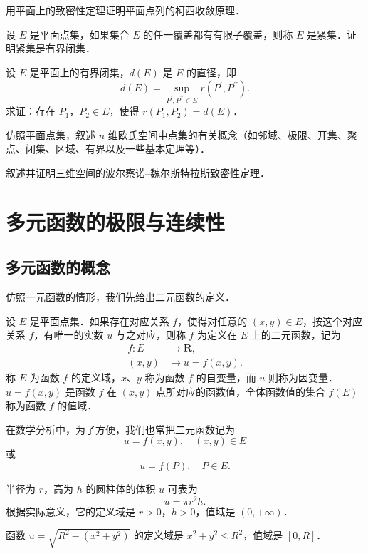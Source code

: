 \begin{xiti}
\item 用平面上的致密性定理证明平面点列的柯西收敛原理．
\item 设 $E$ 是平面点集，如果集合 $E$ 的任一覆盖都有有限子覆盖，则称 $E$ 是紧集．证明紧集是有界闭集．
\item 设 $E$ 是平面上的有界闭集，$d(E)$ 是 $E$ 的直径，即
\[
d(E)=\sup_{P^{\prime},P^{\prime\prime}\in E}r\left(P^{\prime},P^{\prime\prime}\right).
\]
求证：存在 $P_{1}$，$P_{2}\in E$，使得 $r(P_{1},P_{2})=d(E)$．
\item 仿照平面点集，叙述 $n$ 维欧氏空间中点集的有关概念（如邻域、极限、开集、聚点、闭集、区域、有界以及一些基本定理等）．
\item 叙述并证明三维空间的波尔察诺--魏尔斯特拉斯致密性定理．
\end{xiti}

\section{多元函数的极限与连续性}

\subsection{多元函数的概念}

仿照一元函数的情形，我们先给出二元函数的定义．

\begin{definition}\label{def:15-4}
设 $E$ 是平面点集．如果存在对应关系 $f$，使得对任意的 $(x,y)\in E$，按这个对应关系 $f$，有唯一的实数 $u$ 与之对应，则称 $f$ 为定义在 $E$ 上的二元函数，记为
\[
\begin{aligned}
f\colon E&\to\mathbf{R},\\
(x,y)&\to u=f(x,y).
\end{aligned}
\]
称 $E$ 为函数 $f$ 的定义域，$x$、$y$ 称为函数 $f$ 的自变量，而 $u$ 则称为因变量．$u=f(x,y)$ 是函数 $f$ 在 $(x,y)$ 点所对应的函数值，全体函数值的集合 $f(E)$ 称为函数 $f$ 的值域．
\end{definition}

在数学分析中，为了方便，我们也常把二元函数记为
\[
u=f(x,y),\quad(x,y)\in E
\]
或
\[
u=f(P),\quad P\in E.
\]

\begin{example}\label{ex:15-2-1}
半径为 $r$，高为 $h$ 的圆柱体的体积 $u$ 可表为
\[
u=\pi r^{2}h.
\]
根据实际意义，它的定义域是 $r>0$，$h>0$，值域是 $(0,+\infty)$．
\end{example}

\begin{example}\label{ex:15-2-2}
函数 $u=\sqrt{R^{2}-\left(x^{2}+y^{2}\right)}$ 的定义域是 $x^{2}+y^{2}\leqslant R^{2}$，值域是 $[0,R]$．
\end{example}

